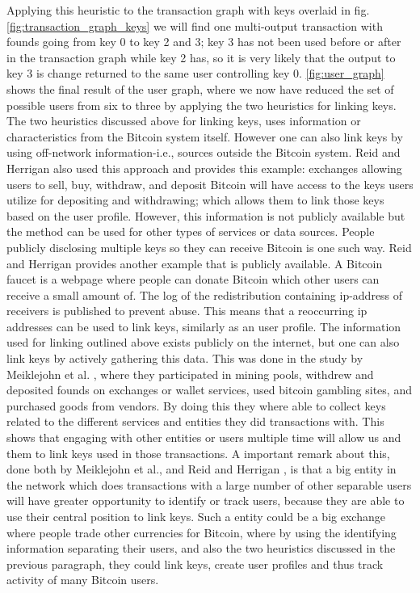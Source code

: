 Applying this heuristic to the transaction graph with keys overlaid in fig.\ref{fig:transaction_graph_keys} we will find one multi-output transaction with founds going from key 0 to key 2 and 3; key 3 has not been used before or after in the transaction graph while key 2 has, so it is very likely that the output to key 3 is change returned to the same user controlling key 0. \cref{fig:user_graph} shows the final result of the user graph, where we now have reduced the set of possible users from six to three by applying the two heuristics for linking keys.
\\

The two heuristics discussed above for linking keys, uses information or characteristics from the Bitcoin system itself. However one can also link keys by using off-network information-i.e., sources outside the Bitcoin system.
Reid and Herrigan \cite{reid2013analysis} also used this approach and provides this example: exchanges allowing users to sell, buy, withdraw, and deposit Bitcoin will have access to the keys users utilize for depositing and withdrawing; which allows them to link those keys based on the user profile. However, this information is not publicly available but the method can be used for other types of services or data sources. People publicly disclosing multiple keys so they can receive Bitcoin is one such way. Reid and Herrigan \cite{reid2013analysis} provides another example that is publicly available. A Bitcoin faucet is a webpage where people can donate Bitcoin which other users can receive a small amount of. The log of the redistribution containing ip-address of receivers is published to prevent abuse. This means that a reoccurring ip addresses can be used to link keys, similarly as an user profile. The information used for linking outlined above exists publicly on the internet, but one can also link keys by actively gathering this data. This was done in the study by Meiklejohn et al. \cite{meiklejohn2013fistful}, where they participated in mining pools, withdrew and deposited founds on exchanges or wallet services, used bitcoin gambling sites, and purchased goods from vendors. By doing this they where able to collect keys related to the different services and entities they did transactions with. 
This shows that engaging with other entities or users multiple time will allow us and them to link keys used in those transactions.
A important remark about this, done both by Meiklejohn et al.\cite{meiklejohn2013fistful}, and Reid and Herrigan \cite{reid2013analysis}, is that a big entity in the network which does transactions with a large number of other separable users will have greater opportunity to identify or track users, because they are able to use their central position to link keys. Such a entity could be a big exchange where people trade other currencies for Bitcoin, where by using the identifying information separating their users, and also the two heuristics discussed in the previous paragraph, they could link keys, create user profiles and thus track activity of many Bitcoin users.
\\


